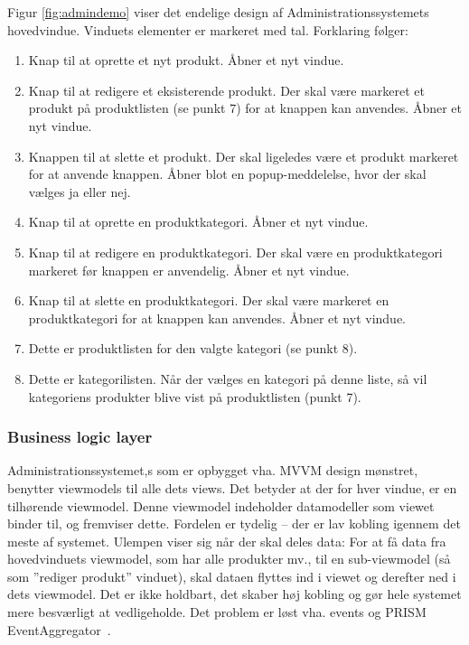 Figur \ref{fig:admindemo} viser det endelige design af Administrationssystemets hovedvindue. Vinduets elementer er markeret med tal. Forklaring følger:
\begin{enumerate}
	\item Knap til at oprette et nyt produkt. Åbner et nyt vindue.
	\item Knap til at redigere et eksisterende produkt. Der skal være markeret et produkt på produktlisten (se punkt 7) for at knappen kan anvendes. Åbner et nyt vindue.
	\item Knappen til at slette et produkt. Der skal ligeledes være et produkt markeret for at anvende knappen. Åbner blot en popup-meddelelse, hvor der skal vælges ja eller nej.
	\item Knap til at oprette en produktkategori. Åbner et nyt vindue.
	\item Knap til at redigere en produktkategori. Der skal være en produktkategori markeret før knappen er anvendelig. Åbner et nyt vindue.
	\item Knap til at slette en produktkategori. Der skal være markeret en produktkategori for at knappen kan anvendes. Åbner et nyt vindue.
	\item Dette er produktlisten for den valgte kategori (se punkt 8).
	\item Dette er kategorilisten. Når der vælges en kategori på denne liste, så vil kategoriens produkter blive vist på produktlisten (punkt 7).
\end{enumerate}

\subsubsection{Business logic layer}

Administrationssystemet,s som er opbygget vha. MVVM design mønstret, benytter viewmodels til alle dets views. Det betyder at der for hver vindue, er en tilhørende viewmodel. Denne viewmodel indeholder datamodeller som viewet binder til, og fremviser dette. Fordelen er tydelig – der er lav kobling igennem det meste af systemet. Ulempen viser sig når der skal deles data: For at få data fra hovedvinduets viewmodel, som har alle produkter mv., til en sub-viewmodel (så som ”rediger produkt” vinduet), skal dataen flyttes ind i viewet og derefter ned i dets viewmodel. Det er ikke holdbart, det skaber høj kobling og gør hele systemet mere besværligt at vedligeholde.
Det problem er løst vha. events og PRISM EventAggregator~\cite{PRISM}.


